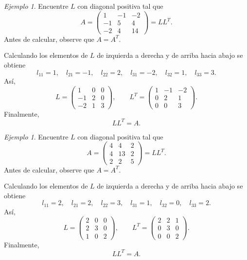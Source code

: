 \documentclass[12pt]{article}
\theoremstyle{remark}
\newtheorem{Ejem}[definicion]{Ejemplo}
\begin{document}
\begin{Ejem}

Encuentre $L$ con diagonal positiva tal que
\[
A=\begin{pmatrix}1 & -1 & -2\\-1 & 5 & 4\\-2 & 4 & 14\end{pmatrix}=LL^T.
\]
Antes de calcular, observe que $A=A^T$.

Calculando los elementos de $L$ de izquierda a derecha y de arriba hacia abajo se obtiene
\[
l_{11}=1,\quad l_{21}=-1,\quad l_{22}=2,\quad l_{31}=-2,\quad l_{32}=1,\quad l_{33}=3.
\]
Así,
\[
L=\begin{pmatrix}1 & 0 & 0\\-1 & 2 & 0\\-2 & 1 & 3\end{pmatrix},\qquad L^T=\begin{pmatrix}1 & -1 & -2\\0 & 2 & 1\\0 & 0 & 3\end{pmatrix}.
\]
Finalmente,
\[
\boxed{LL^T=A}.
\]

\end{Ejem}

\begin{Ejem}

Encuentre $L$ con diagonal positiva tal que
\[
A=\begin{pmatrix}4 & 4 & 2\\4 & 13 & 2\\2 & 2 & 5\end{pmatrix}=LL^T.
\]
Antes de calcular, observe que $A=A^T$.

Calculando los elementos de $L$ de izquierda a derecha y de arriba hacia abajo se obtiene
\[
l_{11}=2,\quad l_{21}=2,\quad l_{22}=3,\quad l_{31}=1,\quad l_{32}=0,\quad l_{33}=2.
\]
Así,
\[
L=\begin{pmatrix}2 & 0 & 0\\2 & 3 & 0\\1 & 0 & 2\end{pmatrix},\qquad L^T=\begin{pmatrix}2 & 2 & 1\\0 & 3 & 0\\0 & 0 & 2\end{pmatrix}.
\]
Finalmente,
\[
\boxed{LL^T=A}.
\]

\end{Ejem}
\end{document}
